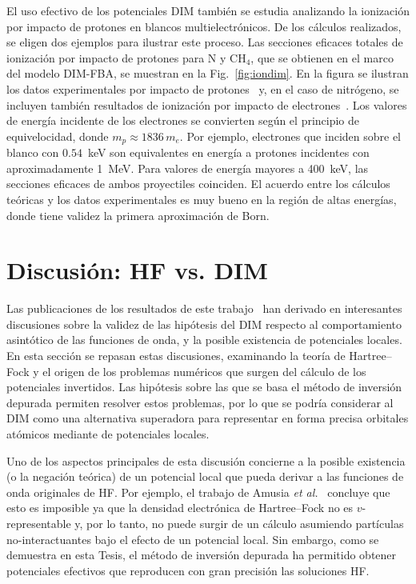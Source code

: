 El uso efectivo de los potenciales DIM también se estudia analizando  
la ionización por impacto de protones en blancos multielectrónicos. De 
los cálculos realizados, se eligen dos ejemplos para ilustrar este 
proceso. Las secciones eficaces totales de ionización por impacto de 
protones para N y CH$_4$, que se obtienen en el marco del modelo 
DIM-FBA, se muestran en la Fig.~\ref{fig:iondim}. En la figura se 
ilustran los datos experimentales por impacto de 
protones~\cite{Rudd:83,Rudd:85} y, en el caso de nitrógeno, se incluyen 
también resultados de ionización por impacto de 
electrones~\cite{Brook:78}. Los valores de energía incidente de los 
electrones se convierten según el principio de equivelocidad, donde 
$m_p\approx 1836\,m_e$. Por ejemplo, electrones que inciden sobre el 
blanco con $0.54$~keV son equivalentes en energía a protones incidentes 
con aproximadamente 1~MeV. Para valores de energía mayores a 400~keV, 
las secciones eficaces de ambos proyectiles coinciden. El acuerdo entre 
los cálculos teóricas y los datos experimentales es muy bueno en la 
región de altas energías, donde tiene validez la primera aproximación de 
Born. 


\section{Discusión: HF vs. DIM}
\label{sec:discusionHF}

Las publicaciones de los resultados de este trabajo~\cite{Mendez:16,
Mendez:19dim,Mendez:18,Mitnik:19} han derivado en interesantes 
discusiones sobre la validez de las hipótesis del DIM respecto al 
comportamiento asintótico de las funciones de onda, y la posible 
existencia de potenciales locales. En esta sección se repasan estas 
discusiones, examinando la teoría de Hartree--Fock y el origen de los 
problemas numéricos que surgen del cálculo de los potenciales 
invertidos. Las hipótesis sobre las que se basa el método de inversión 
depurada permiten resolver estos problemas, por lo que se podría 
considerar al DIM como una alternativa superadora para representar en 
forma precisa orbitales atómicos mediante de potenciales locales.

Uno de los aspectos principales de esta discusión concierne a la posible 
existencia (o la negación teórica) de un potencial local que pueda 
derivar a las funciones de onda originales de HF. Por ejemplo, el 
trabajo de Amusia \textit{et al.}~\cite{Amusia:04} concluye que esto es 
imposible ya que la densidad electrónica de Hartree--Fock no es 
$v$-representable y, por lo tanto, no puede surgir de un cálculo 
asumiendo partículas no-interactuantes bajo el efecto de un potencial 
local. Sin embargo, como se demuestra en esta Tesis, el método de 
inversión depurada ha permitido obtener potenciales efectivos que 
reproducen con gran precisión las soluciones HF.

